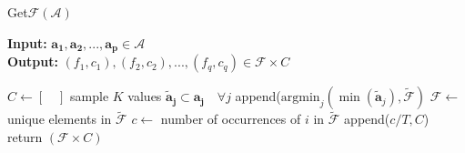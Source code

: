 \documentclass[conference]{IEEEtran}
\newcommand{\p}[1]{{\color{blue} Pdj: #1}}
\begin{document}
\begin{algorithm}
	\caption{ Get$\mathcal{F}$$(\mathcal{A})$ }
	\label{alg:fa}
	\hspace*{\algorithmicindent} \textbf{Input: } $ \mathbf{a_1},\mathbf{a_2} ,..., \mathbf{a_p}\in \mathcal{A}$ \\
	\hspace*{\algorithmicindent} \textbf{Output: } $ (f_1,c_1), (f_2, c_2), ..., (f_q,c_q) \in \mathcal{F} \times C  $
	\begin{algorithmic}[1] 
		\State $C \leftarrow [ \quad ]$ 
		\State sample $K$ values $\mathbf{\tilde{a}_{j}} \subset \mathbf{a_j} \quad \forall j$  
		\State append($\text{argmin}_j(\min(\mathbf{\tilde{a}}_j ), \tilde{\mathcal{F}})$ 
		\EndFor
		\State $\mathcal{F} \leftarrow $ unique elements in $\tilde{\mathcal{F}}$ 
		\State $c \leftarrow$ number of occurrences of $i$ in $\tilde{\mathcal{F}}$ 
		\State append($c/T, C$)
		\EndFor
		\State return $(\mathcal{F} \times C)$
        \end{algorithmic}
\end{algorithm}
\end{document}
